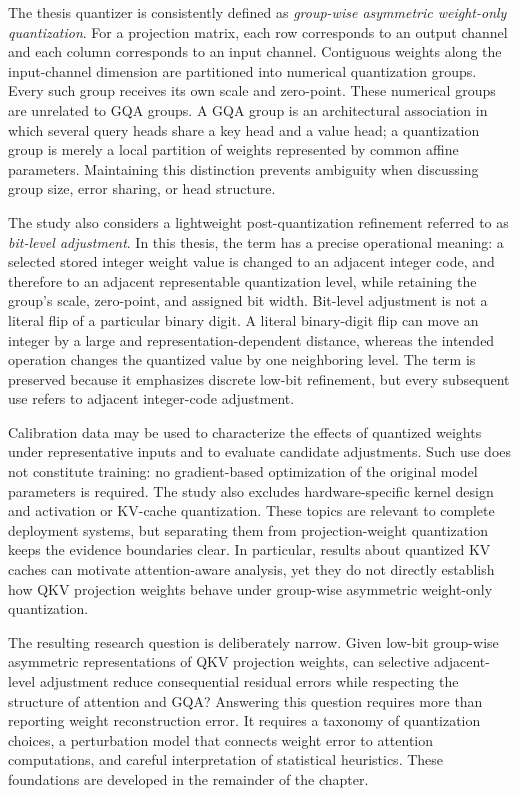 The thesis quantizer is consistently defined as \emph{group-wise asymmetric weight-only quantization}. For a projection matrix, each row corresponds to an output channel and each column corresponds to an input channel. Contiguous weights along the input-channel dimension are partitioned into numerical quantization groups. Every such group receives its own scale and zero-point. These numerical groups are unrelated to GQA groups. A GQA group is an architectural association in which several query heads share a key head and a value head; a quantization group is merely a local partition of weights represented by common affine parameters. Maintaining this distinction prevents ambiguity when discussing group size, error sharing, or head structure.

The study also considers a lightweight post-quantization refinement referred to as \emph{bit-level adjustment}. In this thesis, the term has a precise operational meaning: a selected stored integer weight value is changed to an adjacent integer code, and therefore to an adjacent representable quantization level, while retaining the group's scale, zero-point, and assigned bit width. Bit-level adjustment is not a literal flip of a particular binary digit. A literal binary-digit flip can move an integer by a large and representation-dependent distance, whereas the intended operation changes the quantized value by one neighboring level. The term is preserved because it emphasizes discrete low-bit refinement, but every subsequent use refers to adjacent integer-code adjustment.

Calibration data may be used to characterize the effects of quantized weights under representative inputs and to evaluate candidate adjustments. Such use does not constitute training: no gradient-based optimization of the original model parameters is required. The study also excludes hardware-specific kernel design and activation or KV-cache quantization. These topics are relevant to complete deployment systems, but separating them from projection-weight quantization keeps the evidence boundaries clear. In particular, results about quantized KV caches can motivate attention-aware analysis, yet they do not directly establish how QKV projection weights behave under group-wise asymmetric weight-only quantization.

The resulting research question is deliberately narrow. Given low-bit group-wise asymmetric representations of QKV projection weights, can selective adjacent-level adjustment reduce consequential residual errors while respecting the structure of attention and GQA? Answering this question requires more than reporting weight reconstruction error. It requires a taxonomy of quantization choices, a perturbation model that connects weight error to attention computations, and careful interpretation of statistical heuristics. These foundations are developed in the remainder of the chapter.

